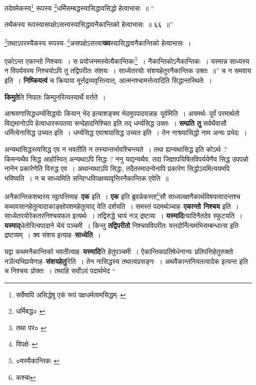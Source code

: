 \documentclass[article,12pt,a4paper]{memoir}
\begin{document}
	तदेवमेकस्य\footnote{सर्वेष्वपि असिद्धेषु एकं रूपं पक्षधर्मत्वमसिद्धम्--\cite{dp-msD-n}} रूपस्य \footnote{धर्मिबद्ध० \cite{dp-msA} \cite{dp-edP} \cite{dp-msB} \cite{dp-edH}}धर्मिसम्बद्धस्यासिद्धावसिद्धो हेत्वाभासः ॥ “
	  
	तथैकस्य रूपस्यासपक्षेऽसत्त्वस्यासिद्धावनैकान्तिको हेत्वाभासः ॥ ६६ ॥” 
	  
	\footnote{तथा पर० \cite{dp-msA} \cite{dp-msB} \cite{dp-edP} \cite{dp-edH}}तथाऽपरस्यैकस्य रूपस्य--\footnote{विपक्षे--\cite{dp-msD-n}}असपक्षेऽसत्त्वा\textbf{ख्य}स्यासिद्धावनैकान्तिको हेत्वाभासः । 
	  
	एकोऽन्त एकान्तो निश्चयः । स प्रयोजनमस्येत्यैकान्तिकः\footnote{०मस्यैकान्तिकः \cite{dp-msC} \cite{dp-msD}} । नैकान्तिकोऽनैकान्तिकः । यस्मान्न साध्यस्य न विपर्ययस्य निश्चयोऽपि तु तद्विपरीतः संशयः । साध्येतरयोः संशयहेतुरनैकान्तिक उक्तः ॥” च न समवाय इति । \textbf{निष्क्रियत्वं} च क्रियाया मूर्त्तद्रव्यवृत्तित्वात्, आत्मनश्चामर्त्तत्वादिति सिद्धान्तस्थितेः ।
	\pend
      

	  \pstart \textbf{किमुते}ति निपातः किम्पुनरित्यस्यार्थे वर्त्तते ।
	\pend
      

	  \pstart आश्रयणासिद्धधर्म्यसिद्धयोः कियान् भेद इत्याशङ्क्य भेदमुपपादयन्नाह--पूर्वमिति । अयमर्थः--पूर्वं परमार्थतो विद्यमानोऽपि हेत्वाधाररूपतया सन्देहादनिश्चित इति तद् धर्म्यसिद्ध उक्तः । \textbf{सम्प्रति तु} सर्वथैवासौ धर्मित्वेनासिद्ध उच्यत इति । धर्म्यसिद्ध एवाश्रयासिद्ध उच्यत इति । तेन नाश्रयासिद्धो नाम अन्यः प्रभेदः ।
	\pend
      

	  \pstart अन्यथासिद्धस्त्वसिद्ध एव न भवतीति न तस्यान्तर्भावश्चिन्त्यते । तथा ह्यन्यथासिद्ध इति कोऽर्थः ? किमन्यथैव सिद्ध आहोस्वित् अन्यथाऽपि सिद्धः ? ननु यद्यन्यथैव, तदा जिज्ञापयिषितविपर्ययेणैव सिद्ध उपपन्नो नानेन प्रकारेणेति विरुद्ध एव । अथान्यथाऽपि सिद्धः, तदैतस्मादन्येनापि प्रकारेण सिद्धोऽयमित्ययमपि भविष्यति । न च साध्यमिति सन्दिग्धविपक्षव्यावृत्तिरनैकान्तिक एवेति ॥
	\pend
      

	  \pstart अनैकान्तिकशब्दस्य व्युत्पत्तिमाह--\textbf{एक} इति । \textbf{एक} इति ब्रुवन्नेकस्ता\footnote{कश्चा}सौ साध्यलक्षणैकार्थविषयत्वादन्तश्च कथावसानहेतुत्वादाकाङ्क्षोपशमहेतुत्वाद् वेति दर्शयति । समस्तं पदमर्थञ्चाह--\textbf{एकान्तो निश्चय} इति । साध्येतरयोरेकतरनिश्चयफल इत्यर्थः । तद्विरुद्धे चायं नञ् द्रष्टव्यः । \textbf{यस्मादि}त्यादिनैतदेव स्फुटयति । \textbf{यस्माद्}धेतोरित्यपादाने चेयं पञ्चमी । किन्तु \textbf{तद्विपरीतो} निश्चयविपरीतः यत्तदोर्नित्यमभिसम्बन्धात्स इति द्रष्टव्यम् । क्व संशय इत्याह--\textbf{साध्येति} ।
	\pend
      

	  \pstart यद्वा कथमनैकान्तिको भवतीत्याह--\textbf{यस्मादि}ति हेतुपञ्चमी । ऐकान्तिकप्रतिषेधेनान्यः प्रतिपत्तिहेतुरुक्तो नञेंत्यभिप्रायेणाह--\textbf{संशयहेतु}रिति । तेन नासिद्धस्य तथात्वप्रसङ्गः । अथवैकान्तनियतत्वादेक इत्यन्त इति च निश्चयः प्रोक्तः । तथाहि सर्वोऽयं पदार्थभेद  \leavevmode{} “
	  
\end{document}
